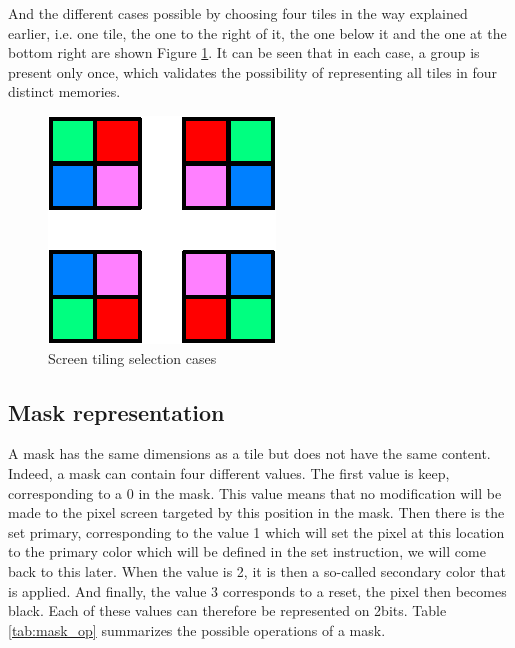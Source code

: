 And the different cases possible by choosing four tiles in the way explained earlier, i.e. one 
tile, the one to the right of it, the one below it and the one at the bottom right are shown 
Figure \ref{fig:gpu/screen_tiling_cases}. It can be seen that in each case, a group is present only 
once, which validates the possibility of representing all tiles in four distinct memories.

\begin{figure}[H]
    \centering
    \includegraphics[scale=1.0]{Chapter4-GPU_CLKU/res/screen_tiling_cases}
    \caption{Screen tiling selection cases}
    \label{fig:gpu/screen_tiling_cases}
\end{figure}

\subsection{Mask representation}

A mask has the same dimensions as a tile but does not have the same content. Indeed, a mask can 
contain four different values. The first value is keep, corresponding to a 0 in the mask. This 
value means that no modification will be made to the pixel screen targeted by this position in the 
mask. Then there is the set primary, corresponding to the value 1 which will set the pixel at this 
location to the primary color which will be defined in the set instruction, we will come back to 
this later. When the value is 2, it is then a so-called secondary color that is applied. And 
finally, the value 3 corresponds to a reset, the pixel then becomes black. Each of these values 
can therefore be represented on 2bits. Table \ref{tab:mask_op} summarizes the possible operations
of a mask. 

